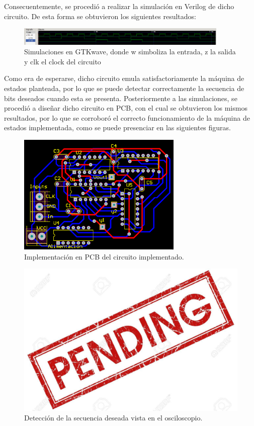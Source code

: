 Consecuentemente, se procedió a realizar la simulación en Verilog de dicho circuito. De esta forma se obtuvieron los siguientes resultados:
\begin{figure}[H]
\centering
\includegraphics[width=0.9\textwidth]{ImagenesEjercicio2/simulacion.png}
\caption{Simulaciones en GTKwave, donde w simboliza la entrada, z la salida y clk el clock del circuito}
\end{figure}

Como era de esperarse, dicho circuito emula satisfactoriamente la máquina de estados planteada, por lo que se puede detectar correctamente la secuencia de bits deseados cuando esta se presenta. Posteriormente a las simulaciones, se procedió a diseñar dicho circuito en PCB, con el cual se obtuvieron los mismos resultados, por lo que se corroboró el correcto funcionamiento de la máquina de estados implementada, como se puede presenciar en las siguientes figuras.
\begin{figure}[H]
\centering
\includegraphics[width=0.7\textwidth]{ImagenesEjercicio2/pcb.png}
\caption{Implementación en PCB del circuito implementado.}
\end{figure}

\begin{figure}[H]
\centering
\includegraphics{ImagenesEjercicio2/pend.jpg}
\caption{Detección de la secuencia deseada vista en el osciloscopio.}
\end{figure}
